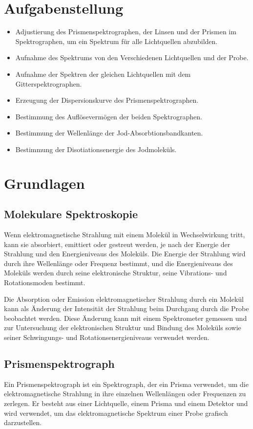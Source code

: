 \documentclass[12pt,english,ngerman]{scrartcl}
\begin{document}
\section{Aufgabenstellung\label{sec:Aufgabenstellung}}

\begin{itemize}
	\item Adjustierung des Prismenspektrographen, der Linsen und der Prismen im Spektrographen, um ein Spektrum für alle 
	Lichtquellen abzubilden.
	\item Aufnahme des Spektrums von den Verschiedenen Lichtquellen und der Probe.
	\item Aufnahme der Spektren der gleichen Lichtquellen mit dem Gitterspektrographen.
	\item Erzeugung der Dispersionskurve des Prismenspektrographen.
	\item Bestimmung des Auflösevermögen der beiden Spektrographen.
	\item Bestimmung der Wellenlänge der Jod-Absorbtionsbandkanten.
	\item Bestimmung der Disotiationsenergie des Jodmoleküls.
\end{itemize}

\section{Grundlagen}\label{sec:Grund}


\subsection{Molekulare Spektroskopie}

Wenn elektromagnetische Strahlung mit einem Molekül in Wechselwirkung tritt, kann sie absorbiert, emittiert oder 
gestreut werden, je nach der Energie der Strahlung und den Energieniveaus des Moleküls. Die Energie der Strahlung 
wird durch ihre Wellenlänge oder Frequenz bestimmt, und die Energieniveaus des Moleküls werden durch seine elektronische 
Struktur, seine Vibrations- und Rotationsmoden bestimmt.

Die Absorption oder Emission elektromagnetischer Strahlung durch ein Molekül kann als Änderung der Intensität der 
Strahlung beim Durchgang durch die Probe beobachtet werden. Diese Änderung kann mit einem Spektrometer gemessen und
zur Untersuchung der elektronischen Struktur und Bindung des Moleküls sowie seiner Schwingungs- und Rotationsenergieniveaus
verwendet werden.

\subsection{Prismenspektrograph}
Ein Prismenspektrograph ist ein Spektrograph, der ein Prisma verwendet, um die elektromagnetische Strahlung in ihre 
einzelnen Wellenlängen oder Frequenzen zu zerlegen. Er besteht aus einer Lichtquelle, einem Prisma und einem Detektor 
und wird verwendet, um das elektromagnetische Spektrum einer Probe grafisch darzustellen.
\end{document}

